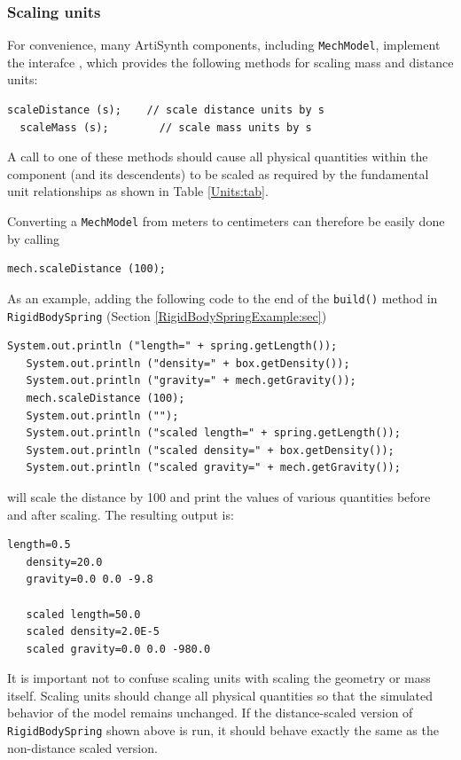 \subsubsection{Scaling units}

For convenience, many ArtiSynth components, including {\tt MechModel},
implement the interafce
, which
provides the following methods for scaling mass and distance units:
%
\begin{lstlisting}[]
  scaleDistance (s);    // scale distance units by s
  scaleMass (s);        // scale mass units by s
\end{lstlisting}
%
A call to one of these methods should cause all physical quantities
within the component (and its descendents) to be
scaled as required by the fundamental unit relationships
as shown in Table \ref{Units:tab}.

Converting a {\tt MechModel} from meters to centimeters can therefore be
easily done by calling 
%
\begin{lstlisting}[]
   mech.scaleDistance (100);
\end{lstlisting}
%
As an example, adding the following code to the end of the {\tt build()}
method in {\tt RigidBodySpring} (Section \ref{RigidBodySpringExample:sec})
%
\begin{lstlisting}[]
   System.out.println ("length=" + spring.getLength());
   System.out.println ("density=" + box.getDensity());
   System.out.println ("gravity=" + mech.getGravity());
   mech.scaleDistance (100);
   System.out.println ("");
   System.out.println ("scaled length=" + spring.getLength());
   System.out.println ("scaled density=" + box.getDensity());
   System.out.println ("scaled gravity=" + mech.getGravity());
\end{lstlisting}
%
will scale the distance by 100 and print the values of various
quantities before and after scaling. The resulting output is:
%
\begin{lstlisting}[]
   length=0.5
   density=20.0
   gravity=0.0 0.0 -9.8

   scaled length=50.0
   scaled density=2.0E-5
   scaled gravity=0.0 0.0 -980.0
\end{lstlisting}
%

It is important not to confuse scaling units with scaling the geometry
or mass itself. Scaling units should change all physical quantities so
that the simulated behavior of the model remains unchanged.  If the
distance-scaled version of {\tt RigidBodySpring} shown above is run,
it should behave exactly the same as the non-distance scaled version.

